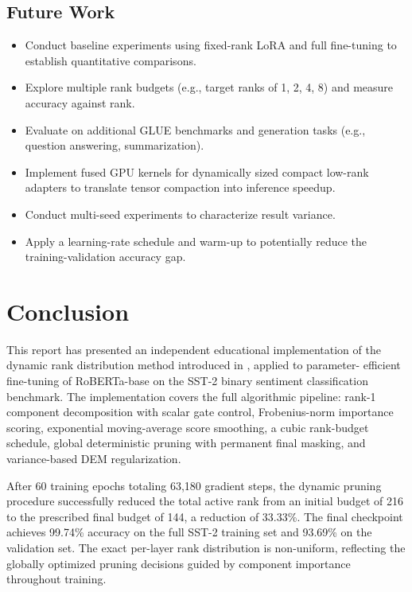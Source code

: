 \documentclass[conference]{IEEEtran}
\begin{document}
\subsection{Future Work}
\begin{itemize}
  \item Conduct baseline experiments using fixed-rank LoRA and
    full fine-tuning to establish quantitative comparisons.
  \item Explore multiple rank budgets (e.g., target ranks of
    1, 2, 4, 8) and measure accuracy against rank.
  \item Evaluate on additional GLUE benchmarks and generation tasks
    (e.g., question answering, summarization).
  \item Implement fused GPU kernels for dynamically sized compact
    low-rank adapters to translate tensor compaction into inference speedup.
  \item Conduct multi-seed experiments to characterize result
    variance.
  \item Apply a learning-rate schedule and warm-up to
    potentially reduce the training-validation accuracy gap.
\end{itemize}

\section{Conclusion}
\label{sec:conclusion}

This report has presented an independent educational
implementation of the dynamic rank distribution method
introduced in \cite{chen2024dora}, applied to parameter-
efficient fine-tuning of RoBERTa-base on the SST-2 binary
sentiment classification benchmark. The implementation covers
the full algorithmic pipeline: rank-1 component decomposition
with scalar gate control, Frobenius-norm importance scoring,
exponential moving-average score smoothing, a cubic rank-budget
schedule, global deterministic pruning with permanent final
masking, and variance-based DEM regularization.

After 60 training epochs totaling 63,180 gradient steps, the
dynamic pruning procedure successfully reduced the total
active rank from an initial budget of 216 to the prescribed
final budget of 144, a reduction of 33.33\%. The final
checkpoint achieves 99.74\% accuracy on the full SST-2
training set and 93.69\% on the validation set. The exact
per-layer rank distribution is non-uniform, reflecting the
globally optimized pruning decisions guided by component
importance throughout training.
\end{document}
